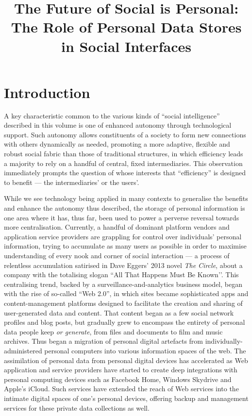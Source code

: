 \documentclass[runningheads,a4paper]{llncs}
\begin{document}
\title{The Future of Social is Personal: The Role of Personal Data Stores in Social Interfaces}


\maketitle

\section{Introduction}

A key characteristic common to the various kinds of ``social intelligence'' described in this volume is one of enhanced autonomy through technological support.  Such autonomy allows constituents of a society to form new connections with others dynamically as needed, promoting a more adaptive, flexible and robust social fabric than those of traditional structures, in which efficiency leads a majority to rely on a handful of central, fixed intermediaries. This observation immediately prompts the question of whose interests that ``efficiency'' is designed to benefit --- the intermediaries' or the users'.

While we see technology being applied in many contexts to generalise the benefits and enhance the autonomy thus described, the storage of personal information is one area where it has, thus far, been used to power a perverse reversal towards more centralisation. Currently, a handful of dominant platform vendors and application service providers are grappling for control over individuals' personal information, trying to accumulate as many users as possible in order to maximise understanding of every nook and corner of social interaction --- a process of relentless accumulation satirised in Dave Eggers’ 2013 novel {\em The Circle}, about a company with the totalising slogan ``All That Happens Must Be Known’’. This centralising trend, backed by a surveillance-and-analytics business model, began with the rise of so-called ``Web 2.0'', in which sites became sophisticated apps and content-management platforms designed to facilitate the creation and sharing of user-generated data and content. That content began as a few social network profiles and blog posts, but gradually grew to encompass the entirety of personal data people keep {\em or generate}, from files and documents to film and music archives. Thus began a migration of personal digital artefacts from individually-administered personal computers into various information spaces of the web.  The assimilation of personal data from personal digital devices has accelerated as Web application and service providers have started to create deep integrations with personal computing devices such as Facebook Home\cite{facebook}, Windows Skydrive\cite{skydrive} and Apple's iCloud\cite{icloud}. Such services have extended the reach of Web services into the intimate digital spaces of one's personal devices, offering backup and management services for these private data collections as well.
\end{document}
